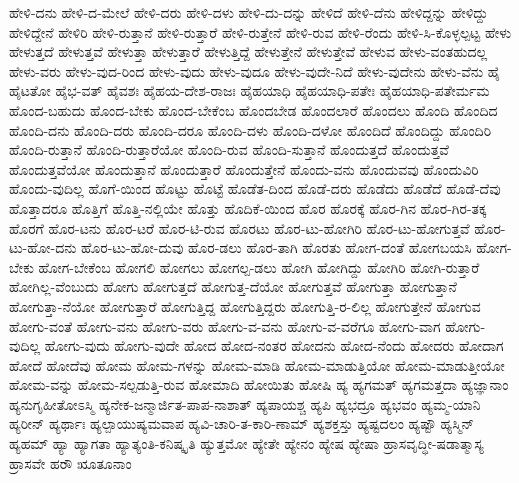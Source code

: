 {ಹೇಳಿ-ದನು
ಹೇಳಿ-ದ-ಮೇಲೆ
ಹೇಳಿ-ದರು
ಹೇಳಿ-ದಳು
ಹೇಳಿ-ದು-ದನ್ನು
ಹೇಳಿದೆ
ಹೇಳಿ-ದೆನು
ಹೇಳಿದ್ದನ್ನು
ಹೇಳಿದ್ದು
ಹೇಳಿದ್ದೇನೆ
ಹೇಳಿರಿ
ಹೇಳಿ-ರುತ್ತಾನೆ
ಹೇಳಿ-ರುತ್ತಾರೆ
ಹೇಳಿ-ರುತ್ತೇನೆ
ಹೇಳಿ-ರುವ
ಹೇಳಿ-ರೆಂದು
ಹೇಳಿ-ಸಿ-ಕೊಳ್ಳಲ್ಪಟ್ಟ
ಹೇಳು
ಹೇಳುತ್ತದೆ
ಹೇಳುತ್ತವೆ
ಹೇಳುತ್ತಾ
ಹೇಳುತ್ತಾರೆ
ಹೇಳುತ್ತಿದ್ದೆ
ಹೇಳುತ್ತೇನೆ
ಹೇಳುತ್ತೇವೆ
ಹೇಳುವ
ಹೇಳು-ವಂತಹುದಲ್ಲ
ಹೇಳು-ವರು
ಹೇಳು-ವುದ-ರಿಂದ
ಹೇಳು-ವುದು
ಹೇಳು-ವುದೂ
ಹೇಳು-ವುದೇ-ನಿದೆ
ಹೇಳು-ವುದೇನು
ಹೇಳು-ವೆನು
ಹೈ
ಹೈಟತೋ
ಹೈಭ-ವತ್
ಹೈವಶಃ
ಹೈಹಯ-ದೇಶ-ರಾಜಃ
ಹೈಹಯಾಧಿ
ಹೈಹಯಾಧಿ-ಪತೇಃ
ಹೈಹಯಾಧಿ-ಪತೇರ್ಮಮ
ಹೊಂದ-ಬಹುದು
ಹೊಂದ-ಬೇಕು
ಹೊಂದ-ಬೇಕೆಂಬ
ಹೊಂದಬೇಡ
ಹೊಂದಲಾರೆ
ಹೊಂದಲು
ಹೊಂದಿ
ಹೊಂದಿದ
ಹೊಂದಿ-ದನು
ಹೊಂದಿ-ದರು
ಹೊಂದಿ-ದರೂ
ಹೊಂದಿ-ದಳು
ಹೊಂದಿ-ದಳೋ
ಹೊಂದಿದೆ
ಹೊಂದಿದ್ದು
ಹೊಂದಿರಿ
ಹೊಂದಿ-ರುತ್ತಾನೆ
ಹೊಂದಿ-ರುತ್ತಾರೆಯೋ
ಹೊಂದಿ-ರುವ
ಹೊಂದಿ-ಸುತ್ತಾನೆ
ಹೊಂದುತ್ತದೆ
ಹೊಂದುತ್ತವೆ
ಹೊಂದುತ್ತವೆಯೋ
ಹೊಂದುತ್ತಾನೆ
ಹೊಂದುತ್ತಾರೆ
ಹೊಂದುತ್ತೇನೆ
ಹೊಂದು-ವನು
ಹೊಂದುವವು
ಹೊಂದುವಿರಿ
ಹೊಂದು-ವುದಿಲ್ಲ
ಹೊಗೆ-ಯಿಂದ
ಹೊಟ್ಟು
ಹೊಟ್ಟೆ
ಹೊಡೆತ-ದಿಂದ
ಹೊಡೆ-ದರು
ಹೊಡೆದು
ಹೊಡೆದೆ
ಹೊಡೆ-ದೆವು
ಹೊತ್ತಾದರೂ
ಹೊತ್ತಿಗೆ
ಹೊತ್ತಿ-ನಲ್ಲಿಯೇ
ಹೊತ್ತು
ಹೊದಿಕೆ-ಯಿಂದ
ಹೊರ
ಹೊರಕ್ಕೆ
ಹೊರ-ಗಿನ
ಹೊರ-ಗಿರ-ತಕ್ಕ
ಹೊರಗೆ
ಹೊರ-ಟನು
ಹೊರ-ಟರೆ
ಹೊರ-ಟಿ-ರುವ
ಹೊರಟು
ಹೊರ-ಟು-ಹೋಗಿರಿ
ಹೊರ-ಟು-ಹೋಗುತ್ತವೆ
ಹೊರ-ಟು-ಹೋ-ದನು
ಹೊರ-ಟು-ಹೋ-ದುವು
ಹೊರ-ಡಲು
ಹೊರ-ತಾಗಿ
ಹೊರತು
ಹೋಗ-ದಂತೆ
ಹೋಗಬಯಸಿ
ಹೋಗ-ಬೇಕು
ಹೋಗ-ಬೇಕೆಂಬ
ಹೋಗಲಿ
ಹೋಗಲು
ಹೋಗಲ್ಪ-ಡಲು
ಹೋಗಿ
ಹೋಗಿದ್ದು
ಹೋಗಿರಿ
ಹೋಗಿ-ರುತ್ತಾರೆ
ಹೋಗಿಲ್ಲ-ವೆಂಬುದು
ಹೋಗು
ಹೋಗುತ್ತದೆ
ಹೋಗುತ್ತ-ದೆಯೋ
ಹೋಗುತ್ತವೆ
ಹೋಗುತ್ತಾ
ಹೋಗುತ್ತಾನೆ
ಹೋಗುತ್ತಾ-ನೆಯೋ
ಹೋಗುತ್ತಾರೆ
ಹೋಗುತ್ತಿದ್ದ
ಹೋಗುತ್ತಿದ್ದರು
ಹೋಗುತ್ತಿ-ರ-ಲಿಲ್ಲ
ಹೋಗುತ್ತೇನೆ
ಹೋಗುವ
ಹೋಗು-ವಂತೆ
ಹೋಗು-ವನು
ಹೋಗು-ವರು
ಹೋಗು-ವ-ವನು
ಹೋಗು-ವ-ವರೆಗೂ
ಹೋಗು-ವಾಗ
ಹೋಗು-ವುದಿಲ್ಲ
ಹೋಗು-ವುದು
ಹೋಗು-ವುದೇ
ಹೋದ
ಹೋದ-ನಂತರ
ಹೋದನು
ಹೋದ-ನೆಂದು
ಹೋದರು
ಹೋದಾಗ
ಹೋದೆ
ಹೋದೆವು
ಹೋಮ
ಹೋಮ-ಗಳನ್ನು
ಹೋಮ-ಮಾಡಿ
ಹೋಮ-ಮಾಡುತ್ತಿಯೋ
ಹೋಮ-ಮಾಡುತ್ತೀಯೋ
ಹೋಮ-ವನ್ನು
ಹೋಮ-ಸಲ್ಪಡುತ್ತಿ-ರುವ
ಹೋಮಾದಿ
ಹೋಯಿತು
ಹೋಷಿ
ಹ್ಯ
ಹ್ಯಗಮತ್
ಹ್ಯಗಮತ್ತದಾ
ಹ್ಯಜ್ಞಾನಾಂ
ಹ್ಯನುಗೃಹೀತೋಽಸ್ಮಿ
ಹ್ಯನೇಕ-ಜನ್ಮಾರ್ಜಿತ-ಪಾಪ-ನಾಶಾತ್
ಹ್ಯಪಾಯಶ್ಚ
ಹ್ಯಪಿ
ಹ್ಯಭದ್ರೂ
ಹ್ಯಭವಂ
ಹ್ಯಮ್ಮ-ಯಾನಿ
ಹ್ಯರೀನ್
ಹ್ಯರ್ಥಾಃ
ಹ್ಯಲ್ಪಾಯುಷ್ಯಮವಾಪ
ಹ್ಯವಿ-ಚಾರಿ-ತ-ಕಾರಿ-ಣಾಮ್
ಹ್ಯಶಕ್ತಸ್ತು
ಹ್ಯಷ್ಟದಲಂ
ಹ್ಯಷ್ಟೌ
ಹ್ಯಸ್ಮಿನ್
ಹ್ಯಹಮ್
ಹ್ಯಾ
ಹ್ಯಾಗತಾ
ಹ್ಯಾತ್ಯಂತಿ-ಕನಿಷ್ಕೃತಿ
ಹ್ಯುತ್ತಮೋ
ಹ್ಯೇತೇ
ಹ್ಯೇನಂ
ಹ್ಯೇಷ
ಹ್ಯೇಷಾ
ಹ್ರಾಸವೃದ್ಧೀ-ಷಡಾತ್ಮಾಸ್ಯ
ಹ್ರಾಸವೇ
ಹರೌ
ೠತೂನಾಂ
}
